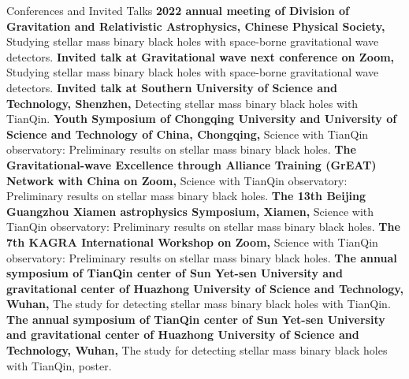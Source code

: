 
\begin{rubric}{Conferences and Invited Talks}
    \entry*[2022] \textbf{2022 annual meeting of Division of Gravitation and Relativistic Astrophysics, Chinese Physical Society,} Studying stellar mass binary black holes with space-borne gravitational wave detectors.
    \entry*[2022] \textbf{Invited talk at Gravitational wave next conference on Zoom,} Studying stellar mass
    binary black holes with space-borne gravitational wave detectors.
    \entry*[2022] \textbf{Invited talk at Southern University of Science and Technology, Shenzhen,} Detecting stellar mass
    binary black holes with TianQin. 
    \entry*[2021] \textbf{Youth Symposium of Chongqing University and University of Science and Technology of China,
    Chongqing,} Science with TianQin observatory: Preliminary results on stellar mass binary black holes.
    \entry*[2021] \textbf{The Gravitational-wave Excellence through Alliance Training (GrEAT) Network with China on
    Zoom,} Science with TianQin observatory: Preliminary results on stellar mass binary black holes.
    \entry*[2020] \textbf{The 13th Beijing Guangzhou Xiamen astrophysics Symposium, Xiamen,} Science with
    TianQin observatory: Preliminary results on stellar mass binary black holes.
    \entry*[2020] \textbf{The 7th KAGRA International Workshop on Zoom,} Science with
    TianQin observatory: Preliminary results on stellar mass binary black holes.
    \entry*[2019] \textbf{The annual symposium of TianQin center of Sun Yet-sen University and gravitational center of
    Huazhong University of Science and Technology,
    Wuhan,} The study for detecting stellar mass binary black holes with TianQin. 
    \entry*[2018] \textbf{The annual symposium of TianQin center of Sun Yet-sen University and gravitational center of
    Huazhong University of Science and Technology,
    Wuhan,} The study for detecting stellar mass binary black holes with TianQin, poster.
\end{rubric}
